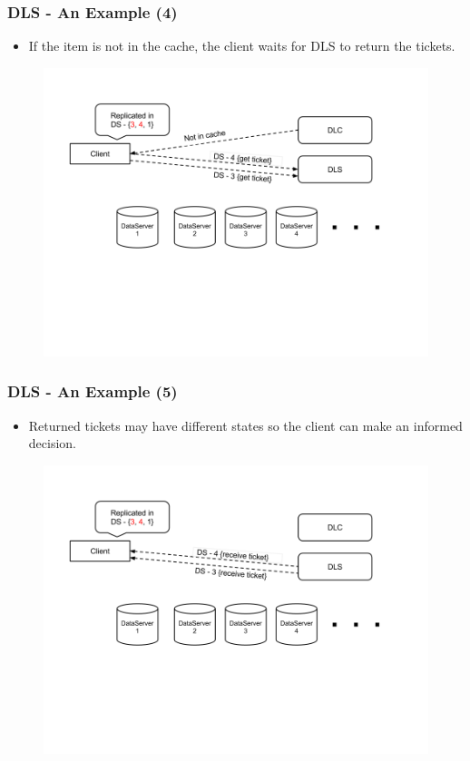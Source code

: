\documentclass{beamer}
\begin{document}
\begin{frame}
  \frametitle{DLS - An Example (4)}
  \begin{itemize}
  \item If the item is not in the cache, the client waits for DLS to
    return the tickets.
    \vspace{-0.1 mm}
  \end{itemize}
  \begin{figure}
    \begin{center}
      \centerline{\includegraphics[scale=0.40]{img/DLS_Example5.png}}
    \end{center}
  \end{figure}
\end{frame}


\begin{frame}
  \frametitle{DLS - An Example (5)}
  \begin{itemize}
  \item Returned tickets may have different states so the client can make an
    informed decision.
  \end{itemize}
  \begin{figure}
    \begin{center}
      \centerline{\includegraphics[scale=0.40]{img/DLS_Example6.png}}
    \end{center}
  \end{figure}
\end{frame}
\end{document}
